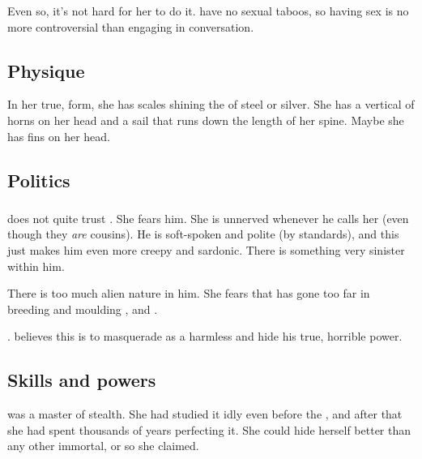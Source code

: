 Even so, it's not hard for her to do it. 
\Dragons{} have no sexual taboos, so having sex is no more controversial than engaging in conversation. 










\subsection{Physique}
In her true, \draconian{} form, she has scales shining the \colour of steel or silver. 
She has a vertical  of horns on her head and a sail that runs down the length of her spine. 
Maybe she has fins on her head. 









\subsection{Politics}





\subsubsection{\Vizsherioch}
\Nzessuacrith{} does not quite trust . 
She fears him. 
She is unnerved whenever he calls her  (even though they \emph{are} cousins). 
He is soft-spoken and polite (by \draconic{} standards), and this just makes him even more creepy and sardonic. 
There is something very sinister within him. 

There is too much alien \xs{} nature in him. 
She fears that \Secherdamon{} has gone too far in breeding and moulding \Vizsherioch, and . 

\Vizsherioch{} . 
\Nzessuacrith{} believes this is to masquerade as a harmless \scatha{} and hide his true, horrible power. 









\subsection{Skills and powers}
\Nzessuacrith was a master of stealth.
She had studied it idly even before the \secondbanewar, and after that she had spent thousands of years perfecting it. 
She could hide herself better than any other immortal, or so she claimed.

